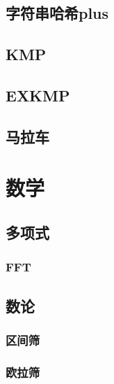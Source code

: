 \subsection{字符串哈希plus}

\subsection{KMP}


\subsection{EXKMP}


\subsection{马拉车}


\section{数学}
\subsection{多项式}
\subsubsection{FFT}


% 
\subsection{数论}
\subsubsection{区间筛}


\subsubsection{欧拉筛}


